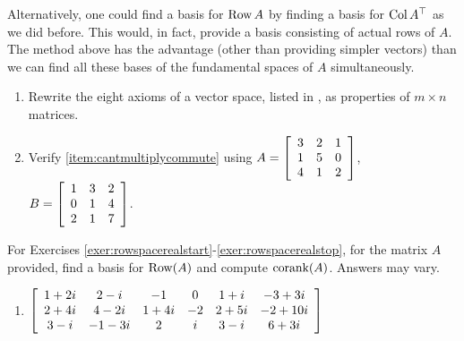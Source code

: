 Alternatively, one could find a basis for $\row A$ by finding a basis for $\col A^\top $ as we did before. This would, in fact, provide a basis consisting of actual rows of $A$. The method above has the advantage (other than providing simpler vectors) than we can find all these bases of the fundamental spaces of $A$ simultaneously. 


\begin{enumerate}[!HW!, start=1]
\item Rewrite the eight axioms of a vector space, listed in , as properties of $m\times n$ matrices. \\

\item Verify  \ref{item:cantmultiplycommute} using $A=\mtx{rrr}{3&2&1\\1&5&0\\4&1&2}$, $B=\mtx{rrr}{1&3&2\\0&1&4\\2&1&7}$. %
\end{enumerate}

\noindent For Exercises \ref{exer:rowspacerealstart}-\ref{exer:rowspacerealstop}, for the matrix $A$ provided, find a basis for $\row(A)$ and compute $\corank(A)$. Answers may vary.
\begin{enumerate}[!HW!, label=$\spadesuit$ \arabic*., ref=\arabic*]
\begin{multicols}{2}
\itemspade $\mtx{rrrrrr}{1&0&0&1&1&1\\0&1&0&1&1&0\\0&0&1&1&0&1} \pmod 2$ 
\itemspade $\mtx{rrrr}{2&1&1&1\\4&2&0&3\\2&1&3&0\\0&0&1&2} \pmod 5$
\end{multicols}
\item\label{exer:rowspacerealstop} $\mtx{cccccc}{1+2i&2-i&-1&0&1+i&-3+3i\\2+4i&4-2i&1+4i&-2&2+5i&-2+10i\\3-i&-1-3i&2&i&3-i&6+3i}$ 
\end{enumerate}

